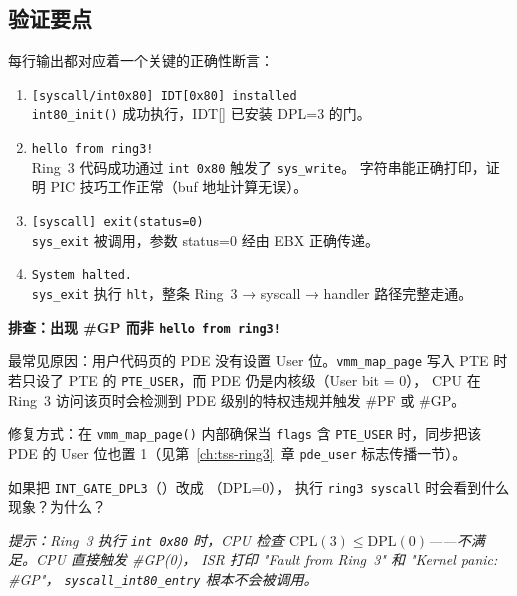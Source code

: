 \subsection{验证要点}

每行输出都对应着一个关键的正确性断言：

\begin{enumerate}
  \item \texttt{[syscall/int0x80] IDT[0x80] installed} \\
    \texttt{int80\_init()} 成功执行，IDT[] 已安装 DPL=3 的门。

  \item \texttt{hello from ring3!} \\
    Ring~3 代码成功通过 \texttt{int 0x80} 触发了 \texttt{sys\_write}。
    字符串能正确打印，证明 PIC 技巧工作正常（buf 地址计算无误）。

  \item \texttt{[syscall] exit(status=0)} \\
    \texttt{sys\_exit} 被调用，参数 status=0 经由 EBX 正确传递。

  \item \texttt{System halted.} \\
    \texttt{sys\_exit} 执行 \texttt{hlt}，整条 Ring~3 → syscall → handler
    路径完整走通。
\end{enumerate}

\begin{warnbox}
\textbf{排查：出现 \#GP 而非 \texttt{hello from ring3!}}

最常见原因：用户代码页的 PDE 没有设置 User 位。\texttt{vmm\_map\_page} 写入
PTE 时若只设了 PTE 的 \texttt{PTE\_USER}，而 PDE 仍是内核级（User bit = 0），
CPU 在 Ring~3 访问该页时会检测到 PDE 级别的特权违规并触发 \#PF 或 \#GP。

修复方式：在 \texttt{vmm\_map\_page()} 内部确保当 \texttt{flags} 含
\texttt{PTE\_USER} 时，同步把该 PDE 的 User 位也置 1（见第~\ref{ch:tss-ring3}~章
\texttt{pde\_user} 标志传播一节）。
\end{warnbox}

\begin{thinkbox}
如果把 \texttt{INT\_GATE\_DPL3}（）改成 （DPL=0），
执行 \texttt{ring3 syscall} 时会看到什么现象？为什么？

\emph{提示：Ring~3 执行 \texttt{int 0x80} 时，CPU 检查
$\text{CPL}(3) \leq \text{DPL}(0)$——不满足。CPU 直接触发 \#GP(0)，
ISR 打印 "Fault from Ring~3" 和 "Kernel panic: \#GP"，
\texttt{syscall\_int80\_entry} 根本不会被调用。}
\end{thinkbox}
